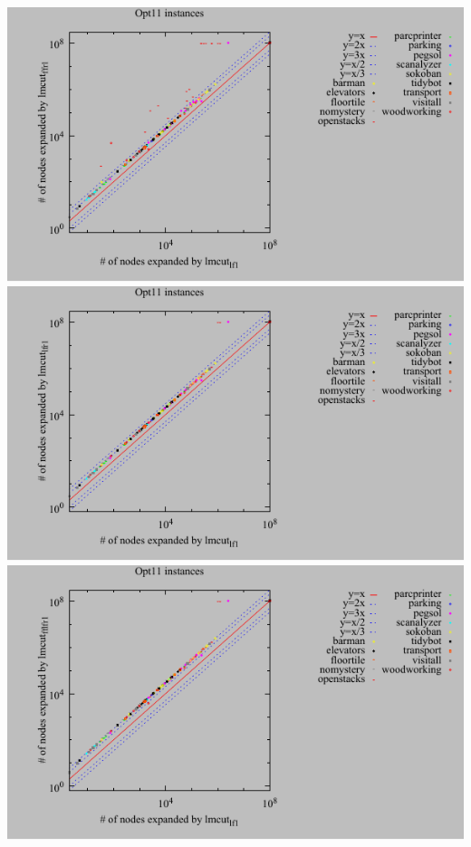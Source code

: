 \includegraphics{tables/opt11-expanded-lmcut_lf-lmcut_ffr.pdf}
\linebreak
\includegraphics{tables/opt11-expanded-lmcut_lf-lmcut_lfr.pdf}
\linebreak
\includegraphics{tables/opt11-expanded-lmcut_lf-lmcut_fflfr.pdf}
\linebreak
